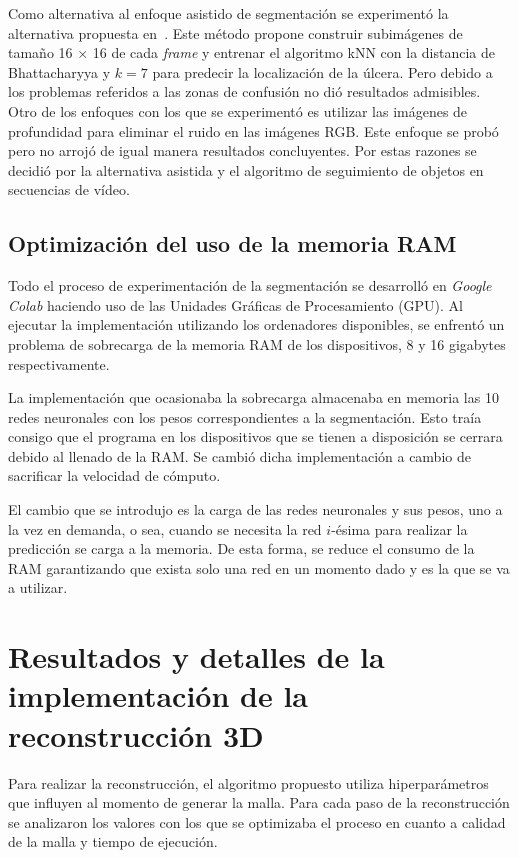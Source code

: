 Como alternativa al enfoque asistido de segmentación se experimentó la alternativa propuesta en~\cite{filko2018wound}. Este método propone construir subimágenes de tamaño 16 $\times$ 16 de cada \textit{frame} y entrenar el algoritmo kNN con la distancia de Bhattacharyya y $k = 7$ para predecir la localización de la úlcera. Pero debido a los problemas referidos a las zonas de confusión no dió resultados admisibles. Otro de los enfoques con los que se experimentó es utilizar las imágenes de profundidad para eliminar el ruido en las imágenes RGB. Este enfoque se probó pero no arrojó de igual manera resultados concluyentes. Por estas razones se decidió por la alternativa asistida y el algoritmo de seguimiento de objetos en secuencias de vídeo.

\subsection{Optimización del uso de la memoria RAM}

Todo el proceso de experimentación de la segmentación se desarrolló en \textit{Google Colab} haciendo uso de las Unidades Gráficas de Procesamiento (GPU). Al ejecutar la implementación utilizando los ordenadores disponibles, se enfrentó un problema de sobrecarga de la memoria RAM de los dispositivos, 8 y 16 gigabytes respectivamente.

La implementación que ocasionaba la sobrecarga almacenaba en memoria las 10 redes neuronales con los pesos correspondientes a la segmentación. Esto traía consigo que el programa en los dispositivos que se tienen a disposición se cerrara debido al llenado de la RAM. Se cambió dicha implementación a cambio de sacrificar la velocidad de cómputo.

El cambio que se introdujo es la carga de las redes neuronales y sus pesos, uno a la vez en demanda, o sea, cuando se necesita la red $i$-ésima para realizar la predicción se carga a la memoria. De esta forma, se reduce el consumo de la RAM garantizando que exista solo una red en un momento dado y es la que se va a utilizar.

\section{Resultados y detalles de la implementación de la reconstrucción 3D}\label{sec:resRec3d}

Para realizar la reconstrucción, el algoritmo propuesto utiliza hiperparámetros que influyen al momento de generar la malla. Para cada paso de la reconstrucción se analizaron los valores con los que se optimizaba el proceso en cuanto a calidad de la malla y tiempo de ejecución.

